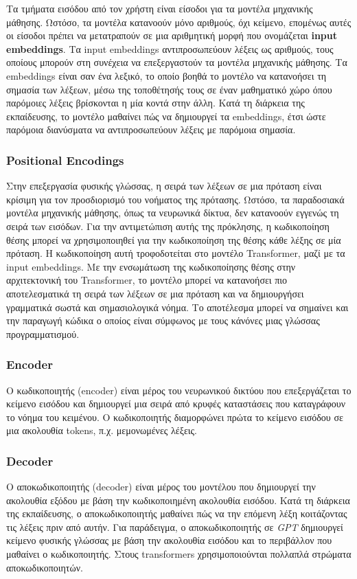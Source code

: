 \documentclass[10pt,leqno]{amsart}
\begin{document}
Τα τμήματα εισόδου από τον χρήστη είναι είσοδοι για τα μοντέλα μηχανικής μάθησης. Ωστόσο, τα μοντέλα κατανοούν μόνο αριθμούς, όχι κείμενο, επομένως αυτές οι είσοδοι πρέπει να μετατραπούν σε μια αριθμητική μορφή που ονομάζεται \textbf{input embeddings}. Tα input embeddings αντιπροσωπεύουν λέξεις ως αριθμούς, τους οποίους μπορούν στη συνέχεια να επεξεργαστούν τα μοντέλα μηχανικής μάθησης. Τα embeddings είναι σαν ένα λεξικό, το οποίο βοηθά το μοντέλο να κατανοήσει τη σημασία των λέξεων, μέσω της τοποθέτησής τους σε έναν μαθηματικό χώρο όπου παρόμοιες λέξεις βρίσκονται η μία κοντά στην άλλη. Κατά τη διάρκεια της εκπαίδευσης, το μοντέλο μαθαίνει πώς να δημιουργεί τα embeddings, έτσι ώστε παρόμοια διανύσματα να αντιπροσωπεύουν λέξεις με παρόμοια σημασία.

\subsubsection{Positional Encodings}

Στην επεξεργασία φυσικής γλώσσας, η σειρά των λέξεων σε μια πρόταση είναι κρίσιμη για τον προσδιορισμό του νοήματος της πρότασης. Ωστόσο, τα παραδοσιακά μοντέλα μηχανικής μάθησης, όπως τα νευρωνικά δίκτυα, δεν κατανοούν εγγενώς τη σειρά των εισόδων. Για την αντιμετώπιση αυτής της πρόκλησης, η κωδικοποίηση θέσης μπορεί να χρησιμοποιηθεί για την κωδικοποίηση της θέσης κάθε λέξης σε μία πρόταση. Η κωδικοποίηση αυτή τροφοδοτείται στο μοντέλο Transformer, μαζί με τα input embeddings. Με την ενσωμάτωση της κωδικοποίησης θέσης στην αρχιτεκτονική του Transformer, το μοντέλο μπορεί να κατανοήσει πιο αποτελεσματικά τη σειρά των λέξεων σε μια πρόταση και να δημιουργήσει γραμματικά σωστά και σημασιολογικά νόημα.
Το  αποτέλεσμα μπορεί να σημαίνει και την παραγωγή κώδικα ο οποίος είναι 
σύμφωνος με τους κάνόνες μιας γλώσσας προγραμματισμού. 

\subsubsection{Encoder}

Ο κωδικοποιητής (encoder) είναι μέρος του νευρωνικού δικτύου που επεξεργάζεται το κείμενο εισόδου και δημιουργεί μια σειρά από κρυφές καταστάσεις που καταγράφουν το νόημα του κειμένου. Ο κωδικοποιητής διαμορφώνει πρώτα το κείμενο εισόδου σε μια ακολουθία tokens, π.χ. μεμονωμένες λέξεις.

\subsubsection{Decoder}
Ο αποκωδικοποιητής (decoder) είναι μέρος του μοντέλου που δημιουργεί την ακολουθία εξόδου με βάση την κωδικοποιημένη ακολουθία εισόδου. Κατά τη διάρκεια της εκπαίδευσης, ο αποκωδικοποιητής μαθαίνει πώς να  την επόμενη λέξη κοιτάζοντας τις λέξεις πριν από αυτήν. Για παράδειγμα, ο αποκωδικοποιητής σε \textit{GPT} δημιουργεί κείμενο φυσικής γλώσσας με βάση την ακολουθία εισόδου και το περιβάλλον που μαθαίνει ο κωδικοποιητής. Στους transformers χρησιμοποιούνται πολλαπλά στρώματα αποκωδικοποιητών.
\end{document}
